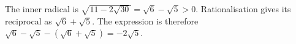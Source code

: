 The inner radical is $\sqrt{11-2\sqrt{30}}=\sqrt6-\sqrt5>0$. Rationalisation gives its reciprocal as $\sqrt6+\sqrt5$. The expression is therefore $\sqrt6-\sqrt5-(\sqrt6+\sqrt5)=\boxed{-2\sqrt5}$.
